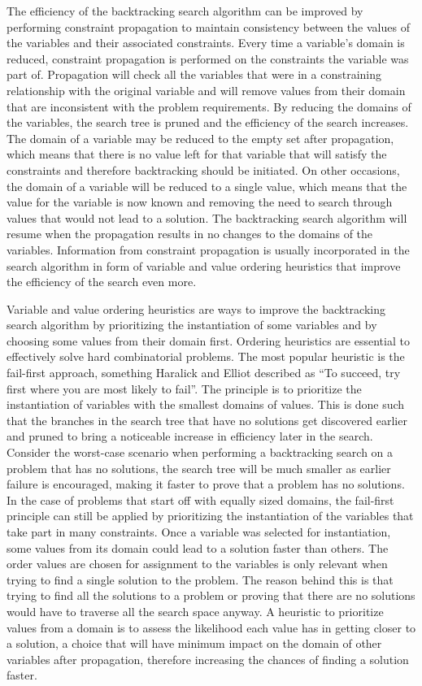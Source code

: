 \documentclass{l4proj}
\begin{document}
\noindent The efficiency of the backtracking search algorithm can be improved by performing constraint propagation to maintain consistency between the values of the variables and their associated constraints. Every time a variable's domain is reduced, constraint propagation is performed on the constraints the variable was part of. Propagation will check all the variables that were in a constraining relationship with the original variable and will remove values from their domain that are inconsistent with the problem requirements. By reducing the domains of the variables, the search tree is pruned and the efficiency of the search increases. The domain of a variable may be reduced to the empty set after propagation, which means that there is no value left for that variable that will satisfy the constraints and therefore backtracking should be initiated. On other occasions, the domain of a variable will be reduced to a single value, which means that the value for the variable is now known and removing the need to search through values that would not lead to a solution. The backtracking search algorithm will resume when the propagation results in no changes to the domains of the variables. Information from constraint propagation is usually incorporated in the search algorithm in form of variable and value ordering heuristics that improve the efficiency of the search even more.

\noindent Variable and value ordering heuristics are ways to improve the backtracking search algorithm by prioritizing the instantiation of some variables and by choosing some values from their domain first. Ordering heuristics are essential to effectively solve hard combinatorial problems. The most popular heuristic is the fail-first approach, something Haralick and Elliot \cite{haralick1980increasing} described as “To succeed, try first where you are most likely to fail”. The principle is to prioritize the instantiation of variables with the smallest domains of values. This is done such that the branches in the search tree that have no solutions get discovered earlier and pruned to bring a noticeable increase in efficiency later in the search. Consider the worst-case scenario when performing a backtracking search on a problem that has no solutions, the search tree will be much smaller as earlier failure is encouraged, making it faster to prove that a problem has no solutions. In the case of problems that start off with equally sized domains, the fail-first principle can still be applied by prioritizing the instantiation of the variables that take part in many constraints. Once a variable was selected for instantiation, some values from its domain could lead to a solution faster than others. The order values are chosen for assignment to the variables is only relevant when trying to find a single solution to the problem. The reason behind this is that trying to find all the solutions to a problem or proving that there are no solutions would have to traverse all the search space anyway. A heuristic to prioritize values from a domain is to assess the likelihood each value has in getting closer to a solution, a choice that will have minimum impact on the domain of other variables after propagation, therefore increasing the chances of finding a solution faster. 
\end{document}

